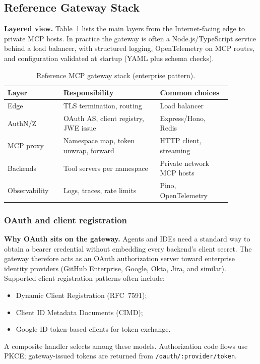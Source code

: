 \documentclass[11pt]{article}
\newcommand{\code}[1]{\texttt{#1}}
\begin{document}
\subsection{Reference Gateway Stack}
\label{sec:ref-arch}

\textbf{Layered view.}
Table~\ref{tab:stack} lists the main layers from the Internet-facing edge to private MCP hosts.
In practice the gateway is often a Node.js/TypeScript service behind a load balancer, with structured logging, OpenTelemetry on MCP routes, and configuration validated at startup (YAML plus schema checks).

\begin{table}[H]
\centering
\caption{Reference MCP gateway stack (enterprise pattern).}
\label{tab:stack}
\small
\begin{tabular}{@{}p{0.22\linewidth}p{0.38\linewidth}p{0.28\linewidth}@{}}
\toprule
Layer & Responsibility & Common choices \\
\midrule
Edge & TLS termination, routing & Load balancer \\
AuthN/Z & OAuth AS, client registry, JWE issue & Express/Hono, Redis \\
MCP proxy & Namespace map, token unwrap, forward & HTTP client, streaming \\
Backends & Tool servers per namespace & Private network MCP hosts \\
Observability & Logs, traces, rate limits & Pino, OpenTelemetry \\
\bottomrule
\end{tabular}
\end{table}

\subsubsection{OAuth and client registration}

\textbf{Why OAuth sits on the gateway.}
Agents and IDEs need a standard way to obtain a bearer credential without embedding every backend's client secret.
The gateway therefore acts as an OAuth authorization server toward enterprise identity providers (GitHub Enterprise, Google, Okta, Jira, and similar).
Supported client registration patterns often include:
\begin{itemize}
  \item Dynamic Client Registration (RFC~7591);
  \item Client ID Metadata Documents (CIMD);
  \item Google ID-token-based clients for token exchange.
\end{itemize}
A composite handler selects among these models.
Authorization code flows use PKCE; gateway-issued tokens are returned from \code{/oauth/:provider/token}.
\end{document}
